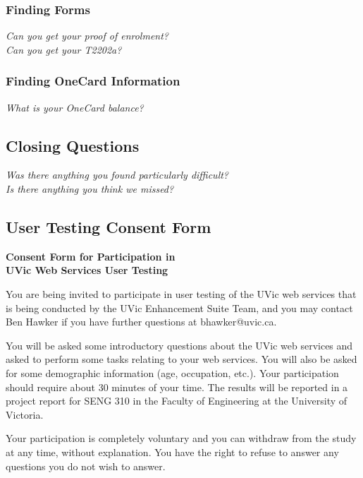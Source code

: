 \documentclass{article}
\begin{document}
\begin{appendices}
\subsubsection*{Finding Forms}\label{finding-forms}
\emph{Can you get your proof of enrolment?} \\
\emph{Can you get your T2202a?} \\
\subsubsection*{Finding OneCard Information}\label{finding-onecard-information}
\emph{What is your OneCard balance?} \\
\subsection*{Closing Questions}\label{closing-questions}
\emph{Was there anything you found particularly difficult?} \\
\emph{Is there anything you think we missed?} \\

\pagebreak
\subsection*{User Testing Consent Form}\label{ap:ut-consent}

\begin{center}
    \textbf{Consent Form for Participation in \\ UVic Web Services User Testing}
\end{center}

You are being invited to participate in user testing of the UVic web services that is being conducted by the UVic Enhancement Suite Team, and you may contact Ben Hawker if you have further questions at bhawker@uvic.ca.

You will be asked some introductory questions about the UVic web services and asked to perform some tasks relating to your web services. You will also be asked for some demographic information (age, occupation, etc.). Your participation should require about 30 minutes of your time. The results will be reported in a project report for SENG 310 in the Faculty of Engineering at the University of Victoria.

Your participation is completely voluntary and you can withdraw from the study at any time, without explanation. You have the right to refuse to answer any questions you do not wish to answer.


\end{appendices}
\end{document}
